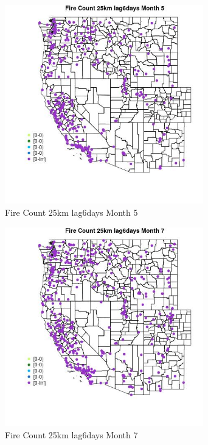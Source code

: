 \begin{figure} 
\centering  
\includegraphics[width=0.77\textwidth]{Code_Outputs/Report_ML_input_PM25_Step4_part_e_de_duplicated_aves_compiled_2019-05-18wNAs_MapObsMo5Fire_Count_25km_lag6days.jpg} 
\caption{\label{fig:Report_ML_input_PM25_Step4_part_e_de_duplicated_aves_compiled_2019-05-18wNAsMapObsMo5Fire_Count_25km_lag6days}Fire Count 25km lag6days Month 5} 
\end{figure} 
 

\begin{figure} 
\centering  
\includegraphics[width=0.77\textwidth]{Code_Outputs/Report_ML_input_PM25_Step4_part_e_de_duplicated_aves_compiled_2019-05-18wNAs_MapObsMo7Fire_Count_25km_lag6days.jpg} 
\caption{\label{fig:Report_ML_input_PM25_Step4_part_e_de_duplicated_aves_compiled_2019-05-18wNAsMapObsMo7Fire_Count_25km_lag6days}Fire Count 25km lag6days Month 7} 
\end{figure} 
 

